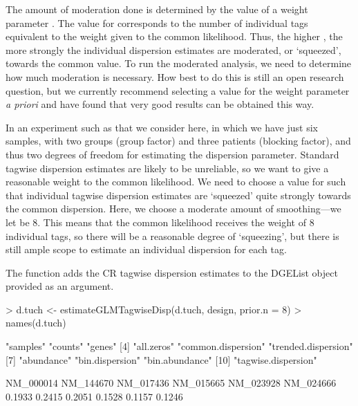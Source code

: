 The amount of moderation done is determined by the value of a weight
parameter . The value for  corresponds to
the number of individual tags equivalent to the weight given to the
common likelihood. Thus, the higher , the more strongly
the individual dispersion estimates are moderated, or `squeezed',
towards the common value. To run the moderated analysis, we need to
determine how much moderation is necessary. How best to do this is
still an open research question, but we currently recommend selecting
a value for the weight parameter  \emph{a priori} and
have found that very good results can be obtained this way.

In an experiment such as that we consider here, in which we have just
six samples, with two groups (group factor) and three patients
(blocking factor), and thus two degrees of freedom for estimating the
dispersion parameter. Standard tagwise dispersion estimates are likely
to be unreliable, so we want to give a reasonable weight to the common
likelihood. We need to choose a value for  such that
individual tagwise dispersion estimates are `squeezed' quite strongly
towards the common dispersion. Here, we choose a moderate amount of
smoothing---we let  be $8$. This means that the common
likelihood receives the weight of $8$ individual tags, so there will
be a reasonable degree of `squeezing', but there is still ample scope
to estimate an individual dispersion for each tag.

The function  adds the CR tagwise
dispersion estimates to the DGEList object provided as an argument.

\begin{Schunk}
\begin{Sinput}
> d.tuch <- estimateGLMTagwiseDisp(d.tuch, design, prior.n = 8)
> names(d.tuch)
\end{Sinput}
\begin{Soutput}
 [1] "samples"            "counts"             "genes"             
 [4] "all.zeros"          "common.dispersion"  "trended.dispersion"
 [7] "abundance"          "bin.dispersion"     "bin.abundance"     
[10] "tagwise.dispersion"
\end{Soutput}
\begin{Soutput}
NM_000014 NM_144670 NM_017436 NM_015665 NM_023928 NM_024666 
   0.1933    0.2415    0.2051    0.1528    0.1157    0.1246 
\end{Soutput}
\end{Schunk}

